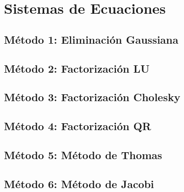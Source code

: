 \documentclass[10pt,a4paper]{article}
\begin{document}
	\section{Sistemas de Ecuaciones}
	
	\subsection{Método 1: Eliminación Gaussiana}
	
	

	\subsection{Método 2: Factorización LU}
	
	
	
	\subsection{Método 3: Factorización Cholesky}
	
	\subsection{Método 4: Factorización QR}

	\subsection{Método 5: Método de Thomas}
	
	
				
	\subsection{Método 6: Método de Jacobi}
	
			
					
\end{document}
